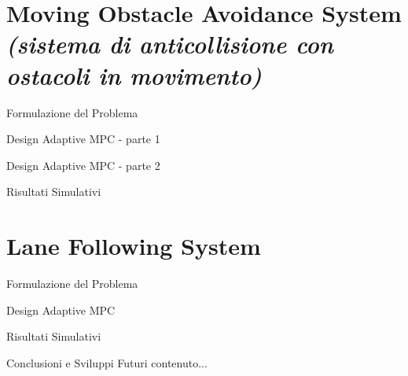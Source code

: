 \documentclass{beamer}
\begin{document}
	\section{Moving Obstacle Avoidance System {\itshape \large (sistema di anticollisione con ostacoli in movimento)}} %
		
	\begin{frame}{Formulazione del Problema} 
	
	\end{frame}
	
	\begin{frame}{Design Adaptive MPC - parte 1} %
		
	\end{frame}
	
	\begin{frame}{Design Adaptive MPC - parte 2} %
		
	\end{frame}
	
	\begin{frame}{Risultati Simulativi}
		
	\end{frame}
	
	\section{Lane Following System \qquad{}}  %
	
	\begin{frame}{Formulazione del Problema}

	\end{frame}
	
	\begin{frame}{Design Adaptive MPC} %
			
	\end{frame}
		
	\begin{frame}{Risultati Simulativi}
			
	\end{frame}
	\begin{frame}{Conclusioni e Sviluppi Futuri}
		contenuto...
	\end{frame}
\end{document}
